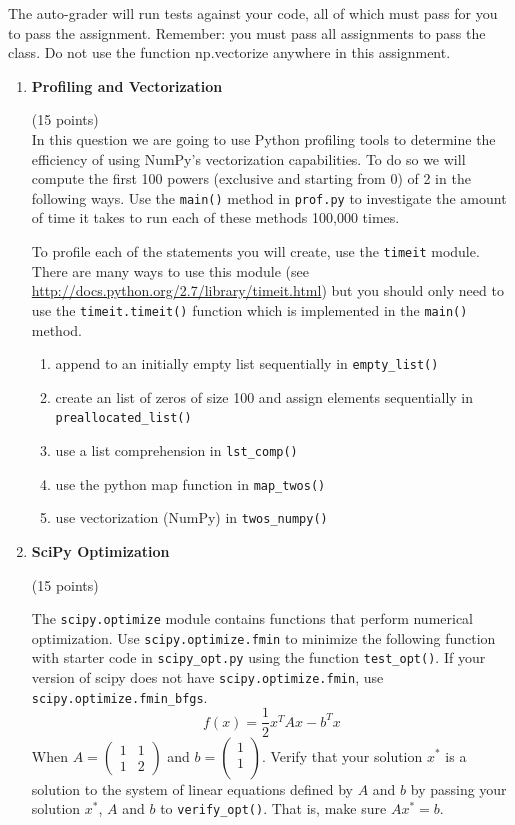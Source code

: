 \documentclass{article}
\newcounter{points}
\newcommand\setpoints[1]{\addtocounter{points}{#1}(#1 points)}
\begin{document}
\pagestyle{fancy}

The auto-grader will run tests against your code, all of which must pass for you to pass the assignment. Remember: you must pass all assignments to pass the class. Do not use the function np.vectorize anywhere in this assignment.

\begin{enumerate}
\item \textbf{Profiling and Vectorization} \setpoints{15} \\
In this question we are going to use Python profiling tools to determine the efficiency of using NumPy's vectorization capabilities. To do so we will compute the first 100 powers (exclusive and starting from 0) of 2 in the following ways. Use the \texttt{main()} method in \texttt{prof.py} to investigate the amount of time it takes to run each of these methods 100,000 times.
\vspace{.1in}

To profile each of the statements you will create, use the \texttt{timeit} module. There are many ways to use this module (see
\url{ http://docs.python.org/2.7/library/timeit.html}) but you should only need to use the \texttt{timeit.timeit()} function which is implemented in the \texttt{main()} method. 

\begin{enumerate}
\item append  to an initially empty list sequentially in \texttt{empty\_list()}
\item create an list of zeros of size 100 and assign elements sequentially in \texttt{preallocated\_list()}
\item use a list comprehension in \texttt{lst\_comp()}
\item use the python map function in \texttt{map\_twos()}
\item use vectorization (NumPy) in  \texttt{twos\_numpy()}
\end{enumerate}

\item \textbf{SciPy Optimization} \setpoints{15}

The \texttt{scipy.optimize} module contains functions that perform numerical optimization. Use \newline
\texttt{scipy.optimize.fmin} to minimize the following function with starter code in \texttt{scipy\_opt.py} using the function \texttt{test\_opt()}. If your version of scipy does not have
\texttt{scipy.optimize.fmin}, use \texttt{scipy.optimize.fmin\_bfgs}.
$$f(x) = \frac{1}{2}x^TAx - b^Tx$$
When 
$A= \begin{pmatrix}
1 & 1\\
1 & 2
\end{pmatrix}$
and $b = \begin{pmatrix}
1 \\
1 \\
\end{pmatrix}$.
Verify that your solution $x^*$ is a solution to the system of linear equations defined by $A$ and $b$ by passing your solution $x^*$, $A$ and $b$ to \texttt{verify\_opt()}. That is, make sure $Ax^*=b$.


\end{enumerate}
\end{document}
